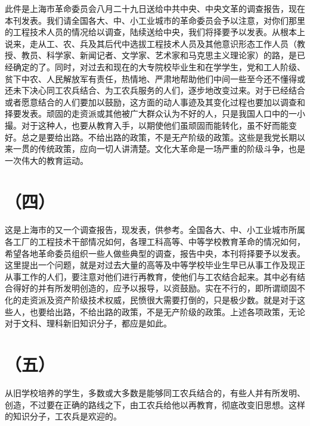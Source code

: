 此件是上海市革命委员会八月二十九日送给中共中央、中央文革的调查报告，现在本刊发表。我们请全国各大、中、小工业城市的革命委员会予以注意，对你们那里的工程技术人员的情况给以调查，陆续送给中央，我们将择要予以发表。从根本上说来，走从工、农、兵及其后代中选拔工程技术人员及其他意识形态工作人员（教授、教员、科学家、新闻记者、文学家、艺术家和马克思主义理论家）的路，是已经确定的了。同时，对过去和现在的大专院校毕业生和在学学生，党和工人阶级、贫下中农、人民解放军有责任，热情地、严肃地帮助他们中间一些至今还不懂得或还未下决心同工农兵结合、为工农兵服务的人们，逐步地改变过来。对于已经结合或者愿意结合的人们要加以鼓励，这方面的动人事迹及其变化过程也要加以调查和择要发表。顽固的走资派或其他被广大群众认为不好的人，只是我国人口中的一小撮。对于这种人，也要从教育入手，以期使他们虽顽固而能转化，虽不好而能变好。总之是要给出路。不给出路的政策，不是无产阶级的政策。这些是我党长期以来一贯的传统政策，应向一切人讲清楚。文化大革命是一场严重的阶级斗争，也是一次伟大的教育运动。

\date{一九六八年九月八日}
\section*{（四）}

这是上海市的又一个调查报告，现发表，供参考。全国各大、中、小工业城市所属各工厂的工程技术干部情况如何，各理工科高等、中等学校教育革命的情况如何，希望各地革命委员组织一些人做些典型的调查，报告中央，本刊将择要予以发表。这里提出一个问题，就是对过去大量的高等及中等学校毕业生早已从事工作及现正从事工作的人们，要注意对他们进行再教育，使他们与工农结合起来。其中必有结合得好的并有所发明创造的，应予以报导，以资鼓励。实在不行的，即所谓顽固不化的走资派及资产阶级技术权威，民愤很大需要打倒的，只是极少数。就是对于这些人，也要给出路，不给出路的政策，不是无产阶级的政策。上述各项政策，无论对于文科、理科新旧知识分子，都应是如此。

\date{一九六八年九月二十二日}
\section*{（五）}

从旧学校培养的学生，多数或大多数是能够同工农兵结合的，有些人并有所发明、创造，不过要在正确的路线之下，由工农兵给他以再教育，彻底改变旧思想。这样的知识分子，工农兵是欢迎的。

